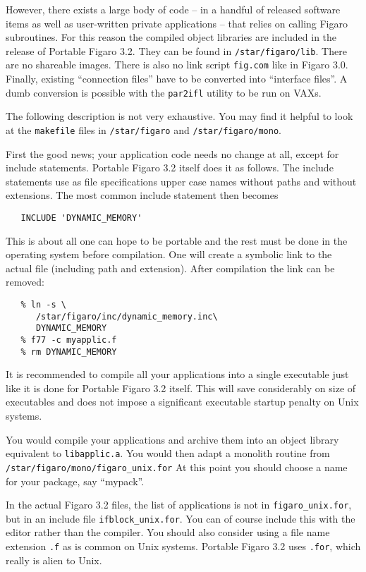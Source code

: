 However, there exists a large body of code -- in a handful of released
software items as well as user-written private applications -- that relies on
calling Figaro subroutines. For this reason the compiled object libraries are
included in the release of Portable Figaro 3.2. They can be found in
{\tt /star/figaro/lib}. There
are no shareable images. There is also no link script {\tt fig.com} like in
Figaro 3.0. Finally, existing ``connection files'' have to be converted into
``interface files''. A dumb conversion is possible with the {\tt par2ifl}
utility to be run on VAXs.

The following description is not very exhaustive. You may find it helpful to
look at the {\tt makefile} files in
{\tt /star/figaro} and {\tt /star/figaro/mono}.

First the good news; your application code needs no change at all, except for
include statements. Portable Figaro 3.2 itself does it as follows. The include
statements use as file specifications upper case names without paths and
without extensions. The most common include statement then becomes
\begin{verbatim}
   INCLUDE 'DYNAMIC_MEMORY'
\end{verbatim}
This is about all one can hope to be portable and the rest must be done in the
operating system before compilation. One will create a
symbolic link to the actual file (including path and extension).
After compilation the
link can be removed:
\begin{verbatim}
   % ln -s \
      /star/figaro/inc/dynamic_memory.inc\
      DYNAMIC_MEMORY
   % f77 -c myapplic.f
   % rm DYNAMIC_MEMORY
\end{verbatim}

It is recommended to compile all your applications into a single executable
just like it is done for Portable
Figaro 3.2 itself. This will save considerably on
size of executables and does not impose a significant executable startup
penalty on Unix systems.

You would compile your applications and archive them into an object library
equivalent to {\tt lib\-app\-lic.a}. You would then adapt a
monolith routine from {\tt /star/\-figaro/\-mono/\-figaro\_\-unix.for}
At this point you
should choose a name for your package, say ``mypack''.

In the actual Figaro 3.2 files, the list
of applications is not in {\tt figaro\_unix.for}, but in an include
file {\tt ifblock\_unix.for}. You can of course include this with the editor
rather than the compiler. You should also consider using a file name extension
{\tt .f} as is common on Unix systems.
Portable Figaro 3.2 uses {\tt .for}, which
really is alien to Unix.

